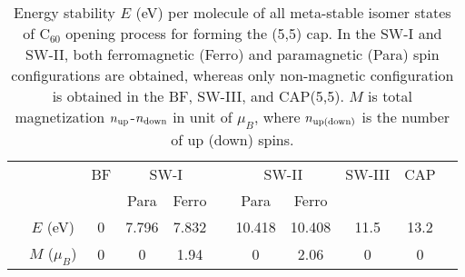 \documentclass[doctor,english,final]{kaist-ucs}
\begin{document}



\begin{table}[t]
\caption{Energy stability $E$ (eV) per molecule of all meta-stable
isomer states of C$_{60}$ opening process for forming the (5,5) cap.
In the SW-I and SW-II, both ferromagnetic (Ferro) and paramagnetic (Para)
spin configurations are obtained, whereas only non-magnetic configuration
is obtained in the BF, SW-III, and CAP(5,5).
$M$ is total magnetization $n_{\rm up}$-$n_{\rm down}$ in unit of $\mu_B$, where
$n_{\rm up(down)}$ is the number of up (down) spins.
}
\label{mag-tab1}
\begin{center}
\begin{tabular} {ccccccccccc}
\hline\hline
& & BF &\multicolumn{2}{c}{SW-I}&&\multicolumn{2}{c}{SW-II}&SW-III&CAP&\\
\cline{4-5} \cline{7-8}
&               &   &  Para & Ferro &&   Para &  Ferro &      &      &\\
\hline
& $E$ (eV)      & 0 & 7.796 & 7.832 && 10.418 & 10.408 & 11.5 & 13.2 &\\
& $M$ ($\mu_B$) & 0 &     0 &  1.94 &&      0 &   2.06 &    0 &    0 &\\
\hline\hline
\end{tabular}
\end{center}
\end{table}






%
%
%
%
%
%
%
\end{document}
